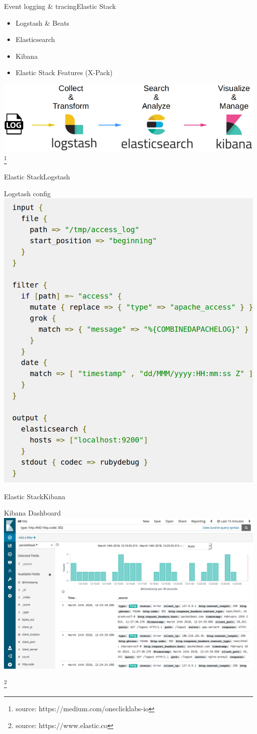 \documentclass{beamer}
\newcommand\blfootnote[1]{%
  \begingroup
  \renewcommand\thefootnote{}\footnote{\tiny  #1 }%
  \addtocounter{footnote}{-1}%
  \endgroup
}
\begin{document}
\begin{frame}{Event logging \& tracing}{Elastic Stack}
	\begin{itemize}
		\item{Logstash \& Beats}
		\item{Elasticsearch}
  		\item{Kibana}
  		\item{Elastic Stack Features (X-Pack)}
	\end{itemize}
	\pause
	\includegraphics[width=.9\linewidth]{logstash_example.png}
	\blfootnote{source: https://medium.com/oneclicklabs-io}
\end{frame}


\begin{frame}{Elastic Stack}{Logstash}
	\begin{block}{Logstash config}
	\centering
		\includegraphics[width=0.4\linewidth]{logstash_config.png}
	\end{block}
\end{frame}


\begin{frame}{Elastic Stack}{Kibana}
	\begin{block}{Kibana Dashboard}
		\centering
		\includegraphics[width=0.8\linewidth]{kibana_screenshot.png}
	\end{block}
	\blfootnote{source: https://www.elastic.co}
\end{frame}
\end{document}

